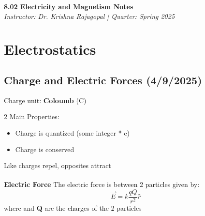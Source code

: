 \documentclass[12pt]{article}
\begin{document}
\begin{center}
    {\LARGE \textbf{8.02 Electricity and Magnetism Notes}} \\
    \vspace{0.5em}
    {\large \textit{Instructor: Dr. Krishna Rajagopal \quad | \quad Quarter: Spring 2025}} \\
    \vspace{0.5em}
\end{center}

\tableofcontents
\newpage


\section{Electrostatics}

\subsection{Charge and Electric Forces (4/9/2025)}

Charge unit: \textbf{Coloumb} (C) 

2 Main Properties:
\begin{itemize}
    \item Charge is quantized (some integer * e)
    \item Charge is conserved
\end{itemize}

Like charges repel, opposites attract
\\
\\
\textbf{Electric Force}
The electric force is between 2 particles given by:
\begin{equation}
       \vec{E}=k \frac{qQ}{r^2}\hat{r} 
\end{equation}
where  and \textbf{Q} are the charges of the 2 particles
\end{document}
